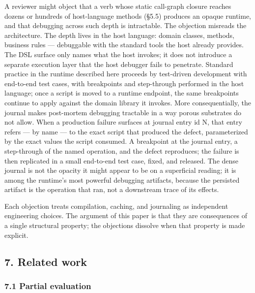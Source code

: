 \documentclass[
]{article}
\begin{document}
A reviewer might object that a verb whose static call-graph closure
reaches dozens or hundreds of host-language methods (§5.5) produces an
opaque runtime, and that debugging across such depth is intractable. The
objection misreads the architecture. The depth lives in the host
language: domain classes, methods, business rules --- debuggable with
the standard tools the host already provides. The DSL surface only names
what the host invokes; it does not introduce a separate execution layer
that the host debugger fails to penetrate. Standard practice in the
runtime described here proceeds by test-driven development with
end-to-end test cases, with breakpoints and step-through performed in
the host language; once a script is moved to a runtime endpoint, the
same breakpoints continue to apply against the domain library it
invokes. More consequentially, the journal makes post-mortem debugging
tractable in a way porous substrates do not allow. When a production
failure surfaces at journal entry id N, that entry refers --- by name
--- to the exact script that produced the defect, parameterized by the
exact values the script consumed. A breakpoint at the journal entry, a
step-through of the named operation, and the defect reproduces; the
failure is then replicated in a small end-to-end test case, fixed, and
released. The dense journal is not the opacity it might appear to be on
a superficial reading; it is among the runtime's most powerful debugging
artifacts, because the persisted artifact is the operation that ran, not
a downstream trace of its effects.

Each objection treats compilation, caching, and journaling as
independent engineering choices. The argument of this paper is that they
are consequences of a single structural property; the objections
dissolve when that property is made explicit.

\subsection{7. Related work}\label{related-work}

\subsubsection{7.1 Partial evaluation}\label{partial-evaluation}
\end{document}
